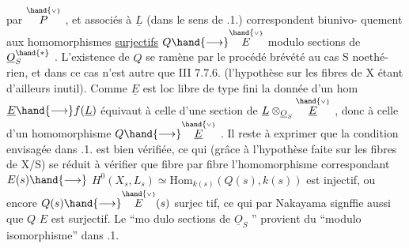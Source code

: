 
par $\overset{\hand{\scriptscriptstyle\vee}}{P}$ , et associés à $\underline{L}$ (dans le sens de .1.) correspondent biunivo-%
quement aux\hand{*} homomorphismes \uline{surjectifs} $Q\hand{\longrightarrow}\overset{\hand{\scriptscriptstyle\vee}}{E}$\hand{,} modulo  sections de $\underline{O}_S^{\hand{*}}$ .\hand{$\blacktriangledown$}
L'existence de $Q$ se ramène par le procédé brévété au cas S noethé-%
rien, et dans ce cas n'est autre que III 7.7.6. (l'hypothèse sur les
fibres de X étant d'ailleurs inutil). Comme $\underline{E}$ est loc libre de type fini
la donnée d'un hom $\underline{E}\hand{\longrightarrow} f(\underline{L})$ équivaut à celle d'une section de
$\underline{L}\otimes_{\underline{O}_S}\overset{\hand{\scriptscriptstyle\vee}}{\underline{E}}$ , donc à celle d'un homomorphisme $Q\hand{\longrightarrow}\overset{\hand{\scriptscriptstyle\vee}}{\underline{E}}$ . Il reste à exprimer
que la condition envisagée dans .1. est bien vérifiée, ce qui (grâce à
l'hypothèse faite sur les fibres de X/S) se réduit à vérifier que
fibre par fibre l'homomorphisme correspondant $E(s)\hand{\longrightarrow}$ \hand{$\vee$}
$H^0(X_s,L_s)\simeq\mathrm{Hom}_{k(s)}(Q(s),k(s))$ est injectif, ou encore $Q(s)\hand{\longrightarrow}\overset{\hand{\scriptscriptstyle\vee}}{E}(s)$ surjec%
tif, ce qui par Nakayama signffie aussi que $Q$ \quad $E$ est surjectif. Le ``mo
dulo sections de $\underline{O}_S$ '' provient du ``modulo isomorphisme'' dans .1.\hand{/}

